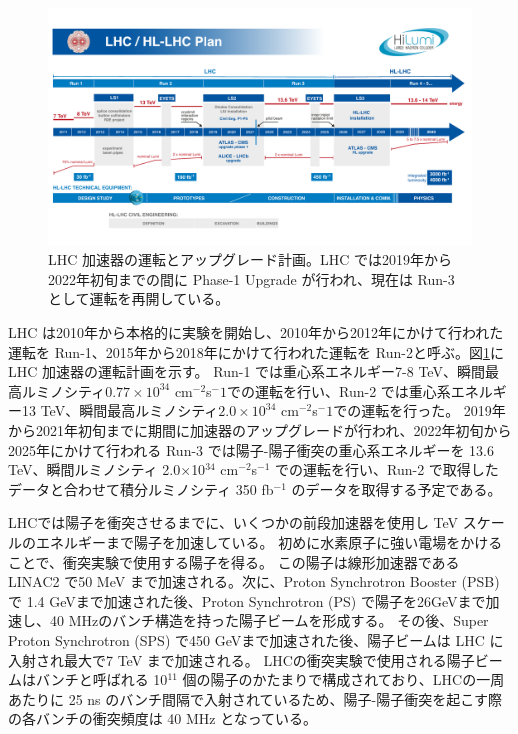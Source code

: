 \begin{figure}[tb]
  \centering
  \includegraphics[clip, width=14cm]{fig/1/HL-LHC_Janvier2022.pdf}
  \caption{LHC 加速器の運転とアップグレード計画。LHC では2019年から2022年初旬までの間に Phase-1 Upgrade が行われ、現在は Run-3 として運転を再開している。}
  \label{fig:LHC_Plan}
\end{figure}

LHC は2010年から本格的に実験を開始し、2010年から2012年にかけて行われた運転を Run-1、2015年から2018年にかけて行われた運転を Run-2と呼ぶ。図\ref{fig:LHC_Plan}に LHC 加速器の運転計画を示す。
Run-1 では重心系エネルギー7-8 TeV、瞬間最高ルミノシティ$0.77\times10^{34}$ cm$^{-2}$s${^-1}$での運転を行い、Run-2 では重心系エネルギー13 TeV、瞬間最高ルミノシティ$2.0\times10^{34}$ cm$^{-2}$s${^-1}$での運転を行った。
2019年から2021年初旬までに期間に加速器のアップグレードが行われ、2022年初旬から2025年にかけて行われる Run-3 では陽子-陽子衝突の重心系エネルギーを 13.6 TeV、瞬間ルミノシティ 2.0$\times$10$^{34}$ cm$^{−2}$s$^{−1}$ での運転を行い、Run-2 で取得したデータと合わせて積分ルミノシティ 350 fb$^{−1}$ のデータを取得する予定である。

LHCでは陽子を衝突させるまでに、いくつかの前段加速器を使用し TeV スケールのエネルギーまで陽子を加速している。
初めに水素原子に強い電場をかけることで、衝突実験で使用する陽子を得る。
この陽子は線形加速器である LINAC2 で50 MeV まで加速される。次に、Proton Synchrotron Booster (PSB) で 1.4 GeVまで加速された後、Proton Synchrotron (PS) で陽子を26GeVまで加速し、40 MHzのバンチ構造を持った陽子ビームを形成する。
その後、Super Proton Synchrotron (SPS) で450 GeVまで加速された後、陽子ビームは LHC に入射され最大で7 TeV まで加速される。
LHCの衝突実験で使用される陽子ビームはバンチと呼ばれる 10${^11}$ 個の陽子のかたまりで構成されており、LHCの一周あたりに 25 ns のバンチ間隔で入射されているため、陽子-陽子衝突を起こす際の各バンチの衝突頻度は 40 MHz となっている。

